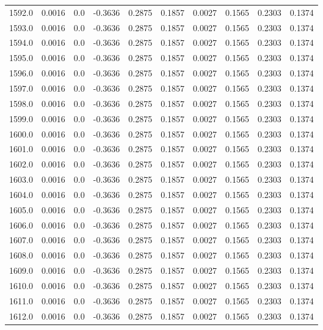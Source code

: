 \begin{longtable}{lrrrrrrrrr}
1592.0 & 0.0016 & 0.0 & -0.3636 & 0.2875 & 0.1857 & 0.0027 & 0.1565 & 0.2303 & 0.1374 \\
1593.0 & 0.0016 & 0.0 & -0.3636 & 0.2875 & 0.1857 & 0.0027 & 0.1565 & 0.2303 & 0.1374 \\
1594.0 & 0.0016 & 0.0 & -0.3636 & 0.2875 & 0.1857 & 0.0027 & 0.1565 & 0.2303 & 0.1374 \\
1595.0 & 0.0016 & 0.0 & -0.3636 & 0.2875 & 0.1857 & 0.0027 & 0.1565 & 0.2303 & 0.1374 \\
1596.0 & 0.0016 & 0.0 & -0.3636 & 0.2875 & 0.1857 & 0.0027 & 0.1565 & 0.2303 & 0.1374 \\
1597.0 & 0.0016 & 0.0 & -0.3636 & 0.2875 & 0.1857 & 0.0027 & 0.1565 & 0.2303 & 0.1374 \\
1598.0 & 0.0016 & 0.0 & -0.3636 & 0.2875 & 0.1857 & 0.0027 & 0.1565 & 0.2303 & 0.1374 \\
1599.0 & 0.0016 & 0.0 & -0.3636 & 0.2875 & 0.1857 & 0.0027 & 0.1565 & 0.2303 & 0.1374 \\
1600.0 & 0.0016 & 0.0 & -0.3636 & 0.2875 & 0.1857 & 0.0027 & 0.1565 & 0.2303 & 0.1374 \\
1601.0 & 0.0016 & 0.0 & -0.3636 & 0.2875 & 0.1857 & 0.0027 & 0.1565 & 0.2303 & 0.1374 \\
1602.0 & 0.0016 & 0.0 & -0.3636 & 0.2875 & 0.1857 & 0.0027 & 0.1565 & 0.2303 & 0.1374 \\
1603.0 & 0.0016 & 0.0 & -0.3636 & 0.2875 & 0.1857 & 0.0027 & 0.1565 & 0.2303 & 0.1374 \\
1604.0 & 0.0016 & 0.0 & -0.3636 & 0.2875 & 0.1857 & 0.0027 & 0.1565 & 0.2303 & 0.1374 \\
1605.0 & 0.0016 & 0.0 & -0.3636 & 0.2875 & 0.1857 & 0.0027 & 0.1565 & 0.2303 & 0.1374 \\
1606.0 & 0.0016 & 0.0 & -0.3636 & 0.2875 & 0.1857 & 0.0027 & 0.1565 & 0.2303 & 0.1374 \\
1607.0 & 0.0016 & 0.0 & -0.3636 & 0.2875 & 0.1857 & 0.0027 & 0.1565 & 0.2303 & 0.1374 \\
1608.0 & 0.0016 & 0.0 & -0.3636 & 0.2875 & 0.1857 & 0.0027 & 0.1565 & 0.2303 & 0.1374 \\
1609.0 & 0.0016 & 0.0 & -0.3636 & 0.2875 & 0.1857 & 0.0027 & 0.1565 & 0.2303 & 0.1374 \\
1610.0 & 0.0016 & 0.0 & -0.3636 & 0.2875 & 0.1857 & 0.0027 & 0.1565 & 0.2303 & 0.1374 \\
1611.0 & 0.0016 & 0.0 & -0.3636 & 0.2875 & 0.1857 & 0.0027 & 0.1565 & 0.2303 & 0.1374 \\
1612.0 & 0.0016 & 0.0 & -0.3636 & 0.2875 & 0.1857 & 0.0027 & 0.1565 & 0.2303 & 0.1374 \\

\end{longtable}
